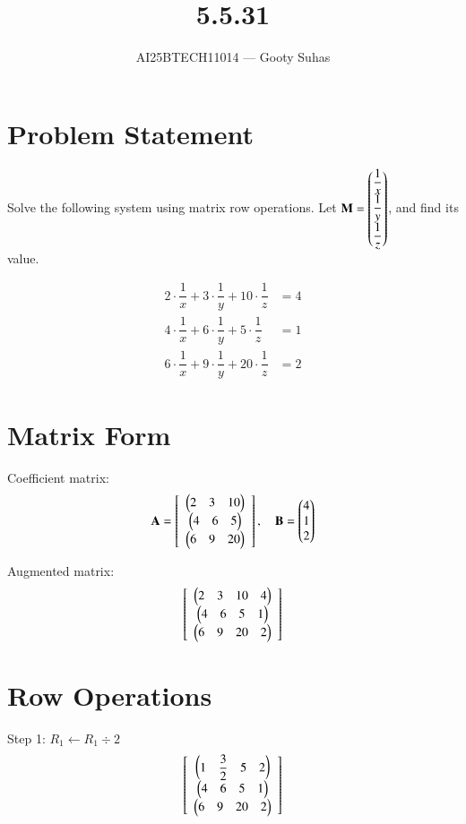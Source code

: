 \documentclass[journal]{IEEEtran}
\title{5.5.31 }
\author{AI25BTECH11014 — Gooty Suhas}
\begin{document}
\maketitle

\section*{Problem Statement}

Solve the following system using matrix row operations.  
Let \( \mathbf{M} = \begin{pmatrix}\dfrac{1}{x} \\ \dfrac{1}{y} \\ \dfrac{1}{z}\end{pmatrix} \), and find its value.

\[
\begin{aligned}
2 \cdot \dfrac{1}{x} + 3 \cdot \dfrac{1}{y} + 10 \cdot \dfrac{1}{z} &= 4 \\
4 \cdot \dfrac{1}{x} + 6 \cdot \dfrac{1}{y} + 5 \cdot \dfrac{1}{z} &= 1 \\
6 \cdot \dfrac{1}{x} + 9 \cdot \dfrac{1}{y} + 20 \cdot \dfrac{1}{z} &= 2
\end{aligned}
\]

\vspace{0.4cm}
\section*{Matrix Form}

Coefficient matrix:
\[
\mathbf{A} =
\left[
\begin{array}{c}
\begin{pmatrix}2 & 3 & 10\end{pmatrix} \\
\begin{pmatrix}4 & 6 & 5\end{pmatrix} \\
\begin{pmatrix}6 & 9 & 20\end{pmatrix}
\end{array}
\right],
\quad
\mathbf{B} = \begin{pmatrix}4 \\ 1 \\ 2\end{pmatrix}
\]

Augmented matrix:
\[
\left[
\begin{array}{c}
\begin{pmatrix}2 & 3 & 10 & 4\end{pmatrix} \\
\begin{pmatrix}4 & 6 & 5 & 1\end{pmatrix} \\
\begin{pmatrix}6 & 9 & 20 & 2\end{pmatrix}
\end{array}
\right]
\]

\vspace{0.4cm}
\section*{Row Operations}

Step 1: \( R_1 \leftarrow R_1 \div 2 \)
\[
\left[
\begin{array}{c}
\begin{pmatrix}1 & \dfrac{3}{2} & 5 & 2\end{pmatrix} \\
\begin{pmatrix}4 & 6 & 5 & 1\end{pmatrix} \\
\begin{pmatrix}6 & 9 & 20 & 2\end{pmatrix}
\end{array}
\right]
\]
\end{document}
